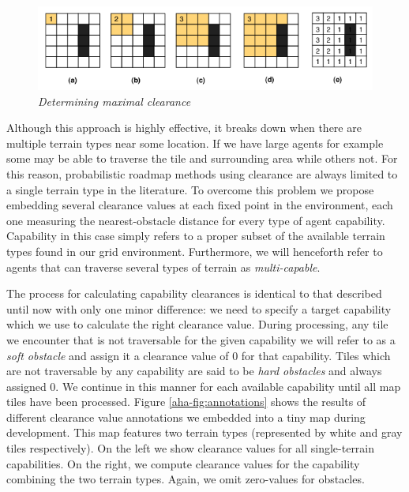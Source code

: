 \begin{figure}[htbp]
        \caption{\emph{Determining maximal clearance} }
        \begin{center}
                        \includegraphics[scale=0.42]{diagrams/calculatingclearance.png}
        \end{center}
        \label{aha-fig:calculatingclearance}
\end{figure}

Although this approach is highly effective, it breaks down when there are multiple terrain types near some location. If we have large agents for example some may be able to traverse the tile and surrounding area while others not. For this reason, probabilistic roadmap methods using clearance are always limited to a single terrain type in the literature. To overcome this problem we propose embedding several clearance values at each fixed point in the environment, each one measuring the nearest-obstacle distance for every type of agent capability.  Capability in this case simply refers to a proper subset of the available terrain types found in our grid environment. Furthermore, we will henceforth refer to agents that can traverse several types of terrain as \emph{multi-capable}.

The process for calculating capability clearances is identical to that described until now with only one minor difference: we need to specify a target capability which we use to calculate the right clearance value. During processing, any tile we encounter that is not traversable for the given capability we will refer to as a \emph{soft obstacle} and assign it a clearance value of 0 for that capability. Tiles which are not traversable by any capability are said to be \emph{hard obstacles} and always assigned 0.  We continue in this manner for each available capability until all map tiles have been processed. Figure \ref{aha-fig:annotations} shows the results of different clearance value annotations we embedded into a tiny map during development. This map features two terrain types (represented by white and gray tiles respectively). On the left we show clearance values for all single-terrain capabilities. On the right, we compute clearance values for the capability combining the two terrain types. Again, we omit zero-values for obstacles.

